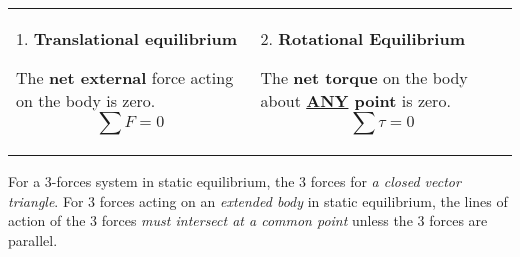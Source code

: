 \documentclass[a4paper]{article}
\begin{document}
			\begin{tabular}{@{} C{0.48\textwidth} C{0.48\textwidth}  @{}}
				1. \textbf{Translational equilibrium} \par The \textbf{net external} force acting on the body is zero. $$\sum F = 0$$ & 2. \textbf{Rotational Equilibrium} \par The \textbf{net torque} on the body about \textbf{\underline{ANY} point} is zero. $$\sum \tau = 0$$ \vspace*{-\baselineskip} \\
			\end{tabular}
			
			For a 3-forces system in static equilibrium, the 3 forces for \textit{a closed vector triangle}. For 3 forces acting on an \textit{extended body} in static equilibrium, the lines of action of the 3 forces \textit{must intersect at a common point} unless the 3 forces are parallel.
\end{document}
